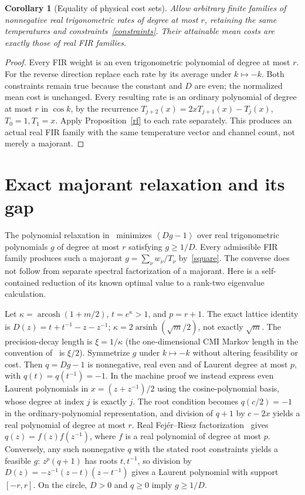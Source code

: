 \documentclass[11pt]{article}
\newtheorem{corollary}[theorem]{Corollary}
\newcommand{\avg}[1]{\left\langle #1\right\rangle}
\begin{document}
\begin{corollary}[Equality of physical cost sets]\label{rateeq}
Allow arbitrary finite families of nonnegative real trigonometric rates of degree at most $r$, retaining the same temperatures and constraints~\eqref{constraints}. Their attainable mean costs are exactly those of real FIR families.
\end{corollary}
\begin{proof}
Every FIR weight is an even trigonometric polynomial of degree at most $r$. For the reverse direction replace each rate by its average under $k\mapsto-k$. Both constraints remain true because the constant and $D$ are even; the normalized mean cost is unchanged. Every resulting rate is an ordinary polynomial of degree at most $r$ in $\cos k$, by the recurrence $T_{j+2}(x)=2xT_{j+1}(x)-T_j(x)$, $T_0=1,T_1=x$. Apply Proposition~\ref{rf} to each rate separately. This produces an actual real FIR family with the same temperature vector and channel count, not merely a majorant.
\end{proof}


\section{Exact majorant relaxation and its gap}
The polynomial relaxation in~\cite[Eq.~(12)--(14)]{gopal} minimizes $\avg{Dg-1}$ over real trigonometric polynomials $g$ of degree at most $r$ satisfying $g\ge1/D$. Every admissible FIR family produces such a majorant $g=\sum_\nu w_\nu/T_\nu$ by~\eqref{square}. The converse does not follow from separate spectral factorization of a majorant. Here is a self-contained reduction of its known optimal value to a rank-two eigenvalue calculation.

Let $\kappa=\operatorname{arcosh}(1+m/2)$, $t=e^\kappa>1$, and $p=r+1$. The exact lattice identity is $D(z)=t+t^{-1}-z-z^{-1}$; $\kappa=2\operatorname{arsinh}(\sqrt m/2)$, not exactly $\sqrt m$. The precision-decay length is $\xi=1/\kappa$ (the one-dimensional CMI Markov length in the convention of~\cite[Sec.~3.1]{gopal} is $\xi/2$). Symmetrize $g$ under $k\mapsto-k$ without altering feasibility or cost. Then $q=Dg-1$ is nonnegative, real even and of Laurent degree at most $p$, with $q(t)=q(t^{-1})=-1$. In the machine proof we instead express even Laurent polynomials in $x=(z+z^{-1})/2$ using the cosine-polynomial basis, whose degree at index $j$ is exactly $j$. The root condition becomes $q(c/2)=-1$ in the ordinary-polynomial representation, and division of $q+1$ by $c-2x$ yields a real polynomial of degree at most $r$. Real Fej\'er--Riesz factorization~\cite[Theorem 4]{dimitrov} gives $q(z)=f(z)f(z^{-1})$, where $f$ is a real polynomial of degree at most $p$. Conversely, any such nonnegative $q$ with the stated root constraints yields a feasible $g$: $z^p(q+1)$ has roots $t,t^{-1}$, so division by $D(z)=-z^{-1}(z-t)(z-t^{-1})$ gives a Laurent polynomial with support $[-r,r]$. On the circle, $D>0$ and $q\ge0$ imply $g\ge1/D$.
\end{document}
